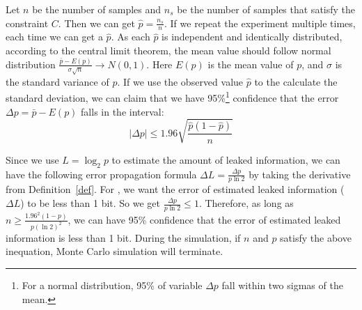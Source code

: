 Let $n$ be the number of samples and $n_s$ be the number of samples that satisfy
the constraint $C$. Then we can get $\hat{p} = \frac{n_s}{n}$. If we repeat the
experiment multiple times, each time we can get a $\hat{p}$. As each
$\hat{p}$ is independent and identically distributed, according to the central limit
theorem, the mean value should follow normal distribution
$ \frac{\bar{p}-E(p)}{\sigma\sqrt{n}} \rightarrow N(0,1) $. Here $E(p)$ is the
mean value of $p$, and $\sigma$ is the standard variance of $p$. If we use the
observed value $\hat{p}$ to the calculate the standard deviation, we can claim that
we have 95\%\footnote{For a normal distribution, 95\% of variable $\Delta p$ fall within two sigmas of the mean.} 
confidence that the error $\Delta p= \bar{p} - E(p)$ falls in the interval:
$$ |\Delta p| \leq 1.96\sqrt{\frac{ \hat{p} (1- \hat{p} )}{n}}$$

Since we use $L = \log_{2}p$ to estimate the amount of leaked information, we
can have the following error propagation formula $\Delta L = \frac{\Delta
p}{p\ln2}$ by taking the derivative from Definition~\ref{def}. For \tool, we want the error of estimated leaked
information ($\Delta L$) to be less than 1 bit. So we get $\frac{\Delta
p}{p\ln2} \leq 1$. Therefore, as long as $ n \geq \frac{1.96^2(1-p)}{p(\ln2)^2}$, we can have
95\% confidence that the error of estimated leaked information is less than 1 bit.
During the simulation, if $n$ and $p$ satisfy the above inequation, Monte Carlo
simulation will terminate.
